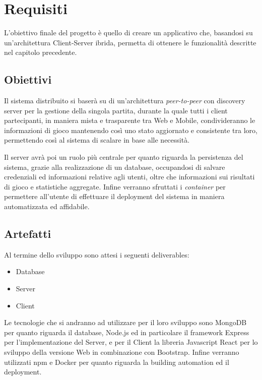 \chapter{Requisiti}
L'obiettivo finale del progetto è quello di creare un applicativo che, basandosi su un'architettura Client-Server ibrida, permetta di ottenere le funzionalità descritte nel capitolo precedente.

\section{Obiettivi}
Il sistema distribuito si baserà su di un'architettura \emph{peer-to-peer}\cite{p2pWikipedia} con discovery server per la gestione della singola partita, durante la quale tutti i client partecipanti, in maniera mista e trasparente tra Web e Mobile, condivideranno le informazioni di gioco mantenendo così uno stato aggiornato e consistente tra loro, permettendo così al sistema di scalare in base alle necessità.

Il server avrà poi un ruolo più centrale per quanto riguarda la persistenza del sistema, grazie alla realizzazione di un database, occupandosi di salvare credenziali ed informazioni relative agli utenti, oltre che informazioni sui risultati di gioco e statistiche aggregate. Infine verranno sfruttati i \emph{container} per permettere all'utente di effettuare il deployment del sistema in maniera automatizzata ed affidabile. 

\section{Artefatti}
Al termine dello sviluppo sono attesi i seguenti deliverables:

\begin{itemize}
    \item Database
    \item Server
    \item Client
\end{itemize}

Le tecnologie che si andranno ad utilizzare per il loro sviluppo sono MongoDB per quanto riguarda il database, Node.js ed in particolare il framework Express per l'implementazione del Server, e per il Client la libreria Javascript React per lo sviluppo della versione Web in combinazione con Bootstrap. Infine verranno utilizzati npm e Docker per quanto riguarda la building automation ed il deployment.

